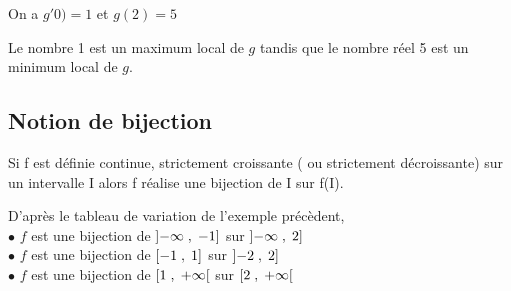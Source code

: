 \begin{center}

On a $ g'0)=1  $\; et \; $ g(2)=5 $
\end{center}
 Le nombre 1 est un maximum local de $ g $ tandis que le nombre réel 5 est un minimum local de $ g $.
\subsection*{Notion de bijection}
\begin{theorem}
 Si f est définie continue, strictement croissante ( ou strictement décroissante)
sur  un intervalle I alors f réalise une bijection de I sur f(I).

\end{theorem}

\begin{example}

D'après le tableau de variation de l'exemple précèdent,\\
$ \bullet $ $ f $ est une bijection de $ \left]-\infty \;, \;-1\right] $ sur $ \left]-\infty \;, \;2\right] $\\
$ \bullet $ $ f $ est une bijection de $ \left[-1\;,\; 1\right] $ sur $ \left]-2 \;, \;2\right] $\\
$ \bullet $ $ f $ est une bijection de $ \left[1 \;,\; +\infty\right[ $ sur $ \left[2 \;,\; +\infty\right[ $

\end{example}

 

